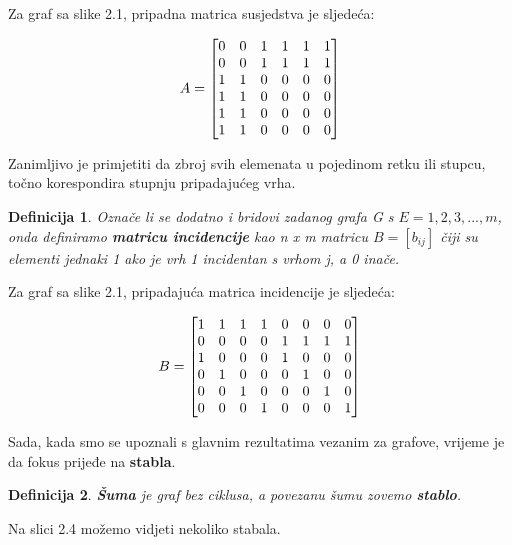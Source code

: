\documentclass[times, utf8, zavrsni]{fer}
\newtheorem{definition}{Definicija}[section]
\begin{document}
Za graf sa slike 2.1, pripadna matrica susjedstva je sljedeća:

\[
\centering
A = 
\begin{bmatrix}
	0 & 0 & 1 & 1 & 1 & 1 \\
	0 & 0 & 1 & 1 & 1 & 1\\
	1 & 1 & 0 & 0 & 0 & 0 \\
	1 & 1 & 0 & 0 & 0 & 0 \\
	1 & 1 & 0 & 0 & 0 & 0 \\
	1 & 1 & 0 & 0 & 0 & 0
\end{bmatrix}
\]

Zanimljivo je primjetiti da zbroj svih elemenata u pojedinom retku ili stupcu, točno korespondira stupnju pripadajućeg vrha.

\begin{definition}
	Označe li se dodatno i bridovi zadanog grafa G s $E = {1, 2, 3, ..., m}$, onda definiramo \textbf{matricu incidencije} kao n x m matricu $B = [b_{ij}]$ čiji su elementi jednaki 1 ako je vrh 1 incidentan s vrhom j, a 0 inače.
\end{definition}

Za graf sa slike 2.1, pripadajuća matrica incidencije je sljedeća:

\[
\centering
B = 
\begin{bmatrix}
	1 & 1 & 1 & 1 & 0 & 0 & 0 & 0 \\
	0 & 0 & 0 & 0 & 1 & 1 & 1 & 1 \\
	1 & 0 & 0 & 0 & 1 & 0 & 0 & 0 \\
	0 & 1 & 0 & 0 & 0 & 1 & 0 & 0 \\
	0 & 0 & 1 & 0 & 0 & 0 & 1 & 0 \\
	0 & 0 & 0 & 1 & 0 & 0 & 0 & 1
\end{bmatrix}
\]

Sada, kada smo se upoznali s glavnim rezultatima vezanim za grafove, vrijeme je da fokus prijeđe na \textbf{stabla}.

\begin{definition}
	\textbf{Šuma} je graf bez ciklusa, a povezanu šumu zovemo \textbf{stablo}.
\end{definition}

Na slici 2.4 možemo vidjeti nekoliko stabala.
\end{document}
